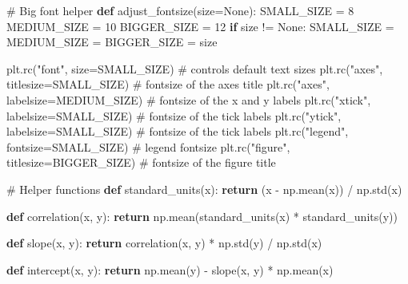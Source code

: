 \documentclass[
  letterpaper,
  DIV=11,
  numbers=noendperiod]{scrreprt}
\newenvironment{Shaded}{\begin{snugshade}}{\end{snugshade}}
\newcommand{\CommentTok}[1]{\textcolor[rgb]{0.37,0.37,0.37}{#1}}
\newcommand{\ControlFlowTok}[1]{\textcolor[rgb]{0.00,0.23,0.31}{\textbf{#1}}}
\newcommand{\DecValTok}[1]{\textcolor[rgb]{0.68,0.00,0.00}{#1}}
\newcommand{\KeywordTok}[1]{\textcolor[rgb]{0.00,0.23,0.31}{\textbf{#1}}}
\newcommand{\NormalTok}[1]{\textcolor[rgb]{0.00,0.23,0.31}{#1}}
\newcommand{\OperatorTok}[1]{\textcolor[rgb]{0.37,0.37,0.37}{#1}}
\newcommand{\StringTok}[1]{\textcolor[rgb]{0.13,0.47,0.30}{#1}}
\newcommand{\VariableTok}[1]{\textcolor[rgb]{0.07,0.07,0.07}{#1}}
\begin{document}
\begin{Shaded}
\begin{Highlighting}[]
\CommentTok{\# Big font helper}
\KeywordTok{def}\NormalTok{ adjust\_fontsize(size}\OperatorTok{=}\VariableTok{None}\NormalTok{):}
\NormalTok{    SMALL\_SIZE }\OperatorTok{=} \DecValTok{8}
\NormalTok{    MEDIUM\_SIZE }\OperatorTok{=} \DecValTok{10}
\NormalTok{    BIGGER\_SIZE }\OperatorTok{=} \DecValTok{12}
    \ControlFlowTok{if}\NormalTok{ size }\OperatorTok{!=} \VariableTok{None}\NormalTok{:}
\NormalTok{        SMALL\_SIZE }\OperatorTok{=}\NormalTok{ MEDIUM\_SIZE }\OperatorTok{=}\NormalTok{ BIGGER\_SIZE }\OperatorTok{=}\NormalTok{ size}

\NormalTok{    plt.rc(}\StringTok{"font"}\NormalTok{, size}\OperatorTok{=}\NormalTok{SMALL\_SIZE)  }\CommentTok{\# controls default text sizes}
\NormalTok{    plt.rc(}\StringTok{"axes"}\NormalTok{, titlesize}\OperatorTok{=}\NormalTok{SMALL\_SIZE)  }\CommentTok{\# fontsize of the axes title}
\NormalTok{    plt.rc(}\StringTok{"axes"}\NormalTok{, labelsize}\OperatorTok{=}\NormalTok{MEDIUM\_SIZE)  }\CommentTok{\# fontsize of the x and y labels}
\NormalTok{    plt.rc(}\StringTok{"xtick"}\NormalTok{, labelsize}\OperatorTok{=}\NormalTok{SMALL\_SIZE)  }\CommentTok{\# fontsize of the tick labels}
\NormalTok{    plt.rc(}\StringTok{"ytick"}\NormalTok{, labelsize}\OperatorTok{=}\NormalTok{SMALL\_SIZE)  }\CommentTok{\# fontsize of the tick labels}
\NormalTok{    plt.rc(}\StringTok{"legend"}\NormalTok{, fontsize}\OperatorTok{=}\NormalTok{SMALL\_SIZE)  }\CommentTok{\# legend fontsize}
\NormalTok{    plt.rc(}\StringTok{"figure"}\NormalTok{, titlesize}\OperatorTok{=}\NormalTok{BIGGER\_SIZE)  }\CommentTok{\# fontsize of the figure title}


\CommentTok{\# Helper functions}
\KeywordTok{def}\NormalTok{ standard\_units(x):}
    \ControlFlowTok{return}\NormalTok{ (x }\OperatorTok{{-}}\NormalTok{ np.mean(x)) }\OperatorTok{/}\NormalTok{ np.std(x)}


\KeywordTok{def}\NormalTok{ correlation(x, y):}
    \ControlFlowTok{return}\NormalTok{ np.mean(standard\_units(x) }\OperatorTok{*}\NormalTok{ standard\_units(y))}


\KeywordTok{def}\NormalTok{ slope(x, y):}
    \ControlFlowTok{return}\NormalTok{ correlation(x, y) }\OperatorTok{*}\NormalTok{ np.std(y) }\OperatorTok{/}\NormalTok{ np.std(x)}


\KeywordTok{def}\NormalTok{ intercept(x, y):}
    \ControlFlowTok{return}\NormalTok{ np.mean(y) }\OperatorTok{{-}}\NormalTok{ slope(x, y) }\OperatorTok{*}\NormalTok{ np.mean(x)}



\end{Highlighting}
\end{Shaded}
\end{document}
